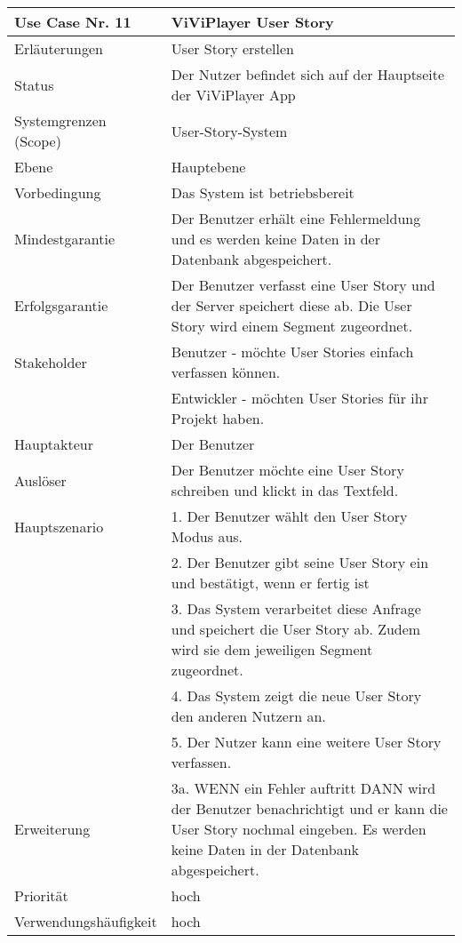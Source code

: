 \begin{tabularx}{\linewidth}{|l|X|}
	\hline
	Use Case Nr. 11			& \textbf{ViViPlayer User Story} \\ \hline
	Erläuterungen			&  User Story erstellen \\ \hline
	Status					&  Der Nutzer befindet sich auf der Hauptseite der ViViPlayer App \\ \hline
	Systemgrenzen (Scope)	&  User-Story-System\\ \hline
	Ebene					&  Hauptebene\\ \hline
	Vorbedingung			&  Das System ist betriebsbereit\\ \hline
	Mindestgarantie			&  Der Benutzer erhält eine Fehlermeldung und es werden keine Daten in der Datenbank abgespeichert.\\ \hline
	Erfolgsgarantie			&  Der Benutzer verfasst eine User Story und der Server speichert diese ab. Die User Story wird einem Segment zugeordnet.\\ \hline
	Stakeholder				&  Benutzer - möchte User Stories einfach verfassen können.\\ 
                            &   Entwickler - möchten User Stories für ihr Projekt haben. \\ \hline
	Hauptakteur				&  Der Benutzer\\ \hline
	Auslöser				&  Der Benutzer möchte eine User Story schreiben und klickt in das Textfeld. \\ \hline	
	Hauptszenario			&  1. Der Benutzer wählt den User Story Modus aus. \\
                            &  2. Der Benutzer gibt seine User Story ein und bestätigt, wenn er fertig ist\\
							&  3. Das System verarbeitet diese Anfrage und speichert die User Story ab. Zudem wird sie dem jeweiligen Segment zugeordnet. \\
							&  4. Das System zeigt die neue User Story den anderen Nutzern an.\\
							&  5. Der Nutzer kann eine weitere User Story verfassen. \\ \hline
	Erweiterung				& 3a. WENN ein Fehler auftritt DANN wird der Benutzer benachrichtigt und er kann die User Story nochmal eingeben. Es werden keine Daten in der Datenbank abgespeichert.\\ \hline
	Priorität				&  hoch \\ \hline
	Verwendungshäufigkeit	&  hoch \\ \hline
\end{tabularx}
